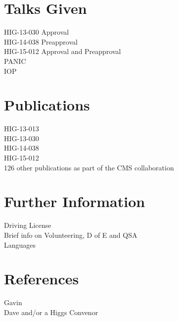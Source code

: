 \documentclass[12pt]{article}
\begin{document}
\section*{Talks Given}
HIG-13-030 Approval \\
HIG-14-038 Preapproval \\
HIG-15-012 Approval and Preapproval \\
PANIC \\
IOP \\
\section*{Publications}
HIG-13-013 \\
HIG-13-030 \\
HIG-14-038 \\
HIG-15-012 \\
126 other publications as part of the CMS collaboration %
\section*{Further Information}
Driving License \\
Brief info on Volunteering, D of E and QSA \\
Languages \\
\section*{References}
Gavin \\
Dave and/or a Higgs Convenor
\end{document}
